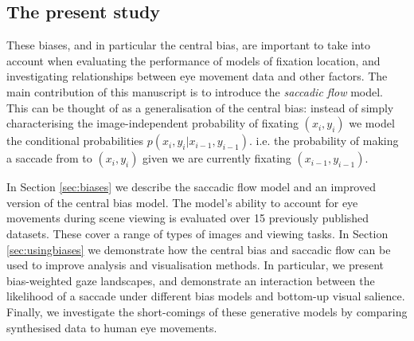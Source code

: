 \subsection{The present study}

These biases, and in particular the central bias, are important to take into account when evaluating the performance of models of fixation location, and investigating relationships between eye movement data and other factors. The main contribution of this manuscript is to introduce the \textit{saccadic flow} model. This can be thought of as a generalisation of the central bias: instead of simply characterising the image-independent probability of fixating $(x_i, y_i)$ we model the conditional probabilities $p(x_i,y_i|x_{i-1}, y_{i-1})$. i.e. the probability of making a saccade from to $(x_i,y_i)$ given we are currently fixating $(x_{i-1}, y_{i-1})$.

In Section \ref{sec:biases} we describe the saccadic flow model and an improved version of the central bias model. The model's ability to account for eye movements during scene viewing is evaluated over 15 previously published datasets. These cover a range of types of images and viewing tasks. In Section \ref{sec:usingbiases} we demonstrate how the central bias and saccadic flow can be used to improve analysis and visualisation methods. In particular, we present bias-weighted gaze landscapes, and demonstrate an interaction between the likelihood of a saccade under different bias models and bottom-up visual salience. Finally, we investigate the short-comings of these generative models by comparing synthesised data to human eye movements. 
